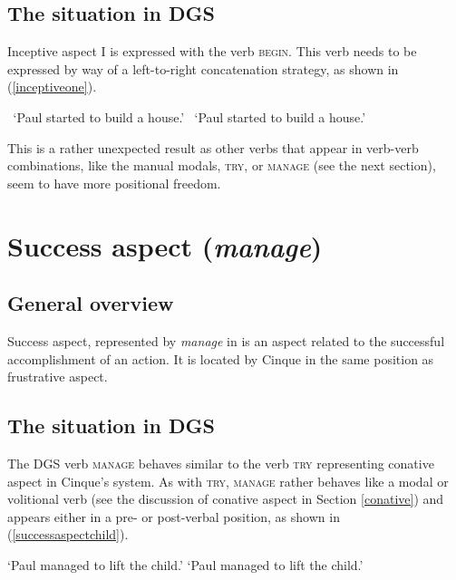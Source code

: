 \subsection{The situation in DGS}
Inceptive aspect I is expressed with the verb \textsc{begin}. This verb needs to be expressed by way of a left-to-right concatenation strategy, as shown in (\ref{inceptiveone}).

\begin{exe}
\ex  \label{inceptiveone}\begin{xlist} 
\glt \textcolor{white}{?}`Paul started to build a house.' \label{ex:inceptiveonea}
\glt \textcolor{white}{?}`Paul started to build a house.' \label{ex:inceptiveoneb}
\end{xlist}
\end{exe} 

\noindent This is a rather unexpected result as other verbs that appear in verb-verb combinations, like the manual modals, \textsc{try}, or \textsc{manage} (see the next section), seem to have more positional freedom.

\section{Success aspect (\textit{manage})}
\subsection{General overview}
Success aspect, represented by \textit{manage} in \citet{cinque1999adverbs, cinque2006restructuring} is an aspect related to the successful accomplishment of an action. It is located by Cinque in the same position as frustrative aspect. 

\subsection{The situation in DGS}
The DGS verb \textsc{manage} behaves similar to the verb \textsc{try} representing conative aspect in Cinque's system. As with \textsc{try}, \textsc{manage} rather behaves like a modal or volitional verb (see the discussion of conative aspect in Section \ref{conative}) and appears either in a pre- or post-verbal position, as shown in (\ref{successaspectchild}).

\begin{exe}
\ex  \label{successaspectchild}\begin{xlist} 
\glt `Paul managed to lift the child.' \label{ex:successaspecta}
\glt `Paul managed to lift the child.' \label{ex:successaspectb}
\end{xlist}
\end{exe} 

